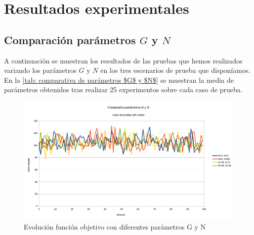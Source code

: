 \chapter{Resultados experimentales}
\label{anexo1}

\section{Comparación parámetros $G$ y $N$}
A continuación se muestran los resultados de las pruebas que hemos realizados variando los parámetros $G$ y $N$ en los tres escenarios de prueba que disponíamos. En la \autoref{tab: comparativa de parámetros $G$ y $N$} se muestran la media de parámetros obtenidos tras realizar 25 experimentos sobre cada caso de prueba.
\begin{figure}[H]
	\begin{center}
		\centering
		\includegraphics[width=1\textwidth]{./imagenes/heuristico/comparativa_parametros_100_vuelos.png}
		\caption{Evolución función objetivo con diferentes parámetros G y N}
		\label{fig: Evolución función objetivo con diferentes parámetros G y N}
	\end{center}
\end{figure}


